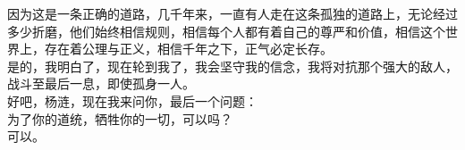 \begin{multicols}{\theparacolNo}
因为这是一条正确的道路，几千年来，一直有人走在这条孤独的道路上，无论经过多少折磨，他们始终相信规则，相信每个人都有着自己的尊严和价值，相信这个世界上，存在着公理与正义，相信千年之下，正气必定长存。\\

是的，我明白了，现在轮到我了，我会坚守我的信念，我将对抗那个强大的敌人，战斗至最后一息，即使孤身一人。\\

好吧，杨涟，现在我来问你，最后一个问题：\\

为了你的道统，牺牲你的一切，可以吗？\\

可以。\\

\ifnum{}
	\end{multicols}
\fi
\newpage
